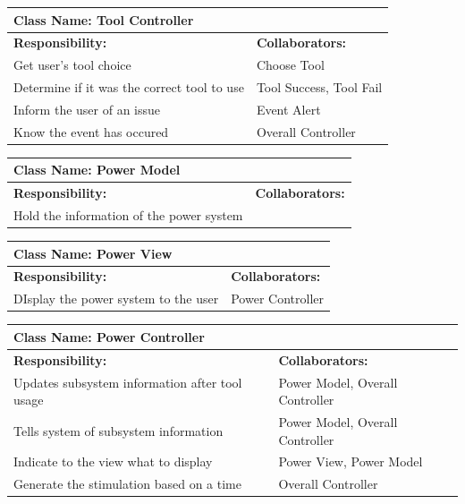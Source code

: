 \documentclass[12pt, titlepage]{article}
\begin{document}
\begin{enumerate}[a)]
	\begin{table}[H]
		\centering
		\begin{tabular}{|p{5cm}|p{5cm}|}
		\hline 
		 \multicolumn{2}{|l|}{\textbf{Class Name: Tool Controller}} \\
		\hline
		\textbf{Responsibility:} & \textbf{Collaborators:} \\
		\hline
		 Get user's tool choice & Choose Tool\\
		\hline
		 Determine if it was the correct tool to use & Tool Success, Tool Fail \\
		\hline
		 Inform the user of an issue & Event Alert \\
		\hline
		 Know the event has occured & Overall Controller \\
		\hline
		\end{tabular}
	\end{table}

	\begin{table}[H]
		\centering
		\begin{tabular}{|p{5cm}|p{5cm}|}
		\hline 
		 \multicolumn{2}{|l|}{\textbf{Class Name: Power Model}} \\
		\hline
		\textbf{Responsibility:} & \textbf{Collaborators:} \\
		\hline
		 Hold the information of the power system & \\
		\hline
		\end{tabular}
	\end{table}

	\begin{table}[H]
		\centering
		\begin{tabular}{|p{5cm}|p{5cm}|}
		\hline 
		 \multicolumn{2}{|l|}{\textbf{Class Name: Power View}} \\
		\hline
		\textbf{Responsibility:} & \textbf{Collaborators:} \\
		\hline
		 DIsplay the power system to the user & Power Controller\\
		\hline
		\end{tabular}
	\end{table}

	\begin{table}[H]
		\centering
		\begin{tabular}{|p{5cm}|p{5cm}|}
		\hline 
		 \multicolumn{2}{|l|}{\textbf{Class Name: Power Controller}} \\
		\hline
		\textbf{Responsibility:} & \textbf{Collaborators:} \\
		\hline
		Updates subsystem information after tool usage & Power Model, Overall Controller\\
		\hline
		 Tells system of subsystem information & Power Model, Overall Controller\\
		\hline
		 Indicate to the view what to display & Power View, Power Model\\
		\hline
		 Generate the stimulation based on a time & Overall Controller \\
		\hline
		\end{tabular}
	\end{table}


\end{enumerate}
\end{document}
